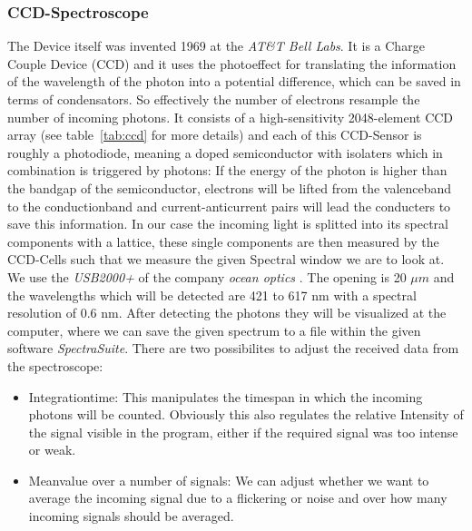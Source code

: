 \subsubsection{CCD-Spectroscope}
The Device itself was invented 1969 at the 
\textit{AT\&T Bell Labs}. It is a Charge Couple Device (CCD) and it uses
the photoeffect for translating the information of the wavelength
of the photon into a potential difference, which can be saved
in terms of condensators. So effectively the number of electrons
resample the number of incoming photons.
It consists of a high-sensitivity 2048-element CCD array 
(see table~\ref{tab:ccd} for more details) and each of this
CCD-Sensor is roughly a photodiode, meaning a doped
semiconductor with isolaters which in combination is triggered
by photons: If the energy of the photon is higher than the 
bandgap of the semiconductor, electrons will be lifted from the
valenceband to the conductionband and current-anticurrent pairs
will lead the conducters to save this information. In our case
the incoming light is splitted into its spectral components with
a lattice, these single components are then measured by the 
CCD-Cells such that we measure the given Spectral window 
we are to look at. We use the \textit{USB2000+} of the company \textit{ocean optics}
\cite{versuchsanleitung}. 
The opening is 20 $\mu m$ and the wavelengths which will be
detected are 421 to 617 nm with a spectral resolution of 0.6 nm.
After detecting 
the photons they will be visualized at the computer, where we
can save the given spectrum to a file within the given software
\textit{SpectraSuite}. There are two possibilites to adjust
the received data from the spectroscope:
\begin{itemize}
    \item Integrationtime: This manipulates the timespan in 
        which the incoming photons will be counted. Obviously
        this also regulates the relative Intensity of the signal
        visible in the program, either
        if the required signal was too intense or weak.
    \item Meanvalue over a number of signals: We can adjust
        whether we want to average the incoming signal due to
        a flickering or noise and over how many incoming signals
        should be averaged.
\end{itemize}

